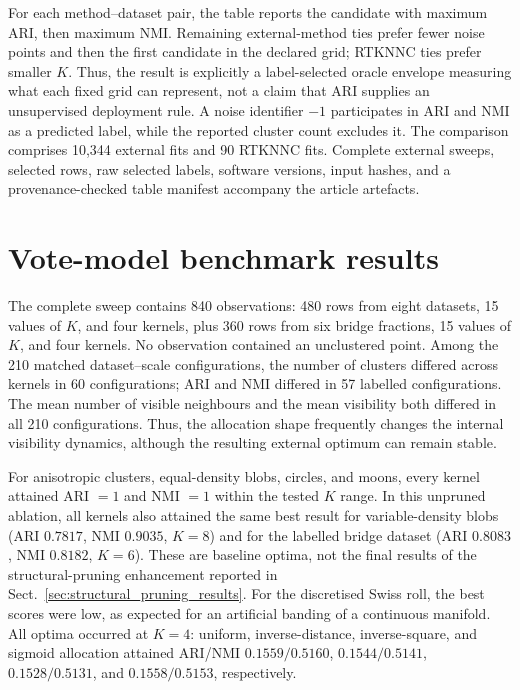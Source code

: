 \documentclass[pdflatex,sn-mathphys-num]{sn-jnl}
\begin{document}
For each method--dataset pair, the table reports the candidate with maximum
ARI, then maximum NMI\@.  Remaining external-method ties prefer fewer noise
points and then the first candidate in the declared grid; RTKNNC ties prefer
smaller $K$.  Thus, the result is explicitly a label-selected oracle envelope
measuring what each fixed grid can represent, not a claim that ARI supplies an
unsupervised deployment rule.  A noise identifier $-1$ participates in ARI
and NMI as a predicted label, while the reported cluster count excludes it.
The comparison comprises 10,344 external fits and 90 RTKNNC fits.  Complete
external sweeps, selected rows, raw selected labels, software versions, input
hashes, and a provenance-checked table manifest accompany the article
artefacts.

\section{Vote-model benchmark results}\label{sec:vote_results}

The complete sweep contains 840 observations: 480 rows from eight datasets, 15 values of $K$, and four kernels, plus 360 rows from six bridge fractions, 15 values of $K$, and four kernels. No observation contained an unclustered point. Among the 210 matched dataset--scale configurations, the number of clusters differed across kernels in 60 configurations; ARI and NMI differed in 57 labelled configurations. The mean number of visible neighbours and the mean visibility both differed in all 210 configurations. Thus, the allocation shape frequently changes the internal visibility dynamics, although the resulting external optimum can remain stable.

For anisotropic clusters, equal-density blobs, circles, and moons, every kernel attained ARI $=1$ and NMI $=1$ within the tested $K$ range. In this unpruned ablation, all kernels also attained the same best result for variable-density blobs (ARI $0.7817$, NMI $0.9035$, $K=8$) and for the labelled bridge dataset (ARI $0.8083$, NMI $0.8182$, $K=6$). These are baseline optima, not the final results of the structural-pruning enhancement reported in Sect.~\ref{sec:structural_pruning_results}. For the discretised Swiss roll, the best scores were low, as expected for an artificial banding of a continuous manifold.  All optima occurred at $K=4$: uniform, inverse-distance, inverse-square, and sigmoid allocation attained ARI/NMI $0.1559/0.5160$, $0.1544/0.5141$, $0.1528/0.5131$, and $0.1558/0.5153$, respectively.
\end{document}
